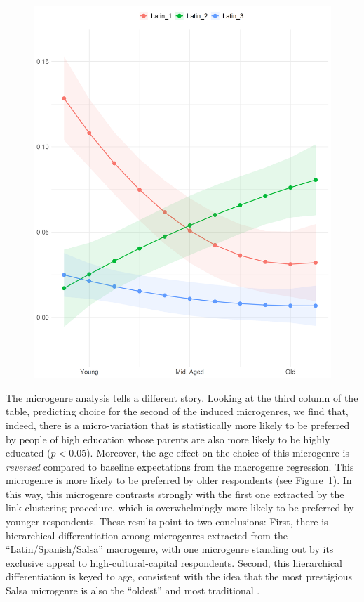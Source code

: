 \documentclass[a4paper,12pt]{extarticle}
\begin{document}
\begin{figure}[ht!]
    \centering    \includegraphics[width=1.0\textwidth]{Plots/Demog/micro-by-age-latin.png}
    \caption{}
    \label{fig:age-salsa}
\end{figure}

The microgenre analysis tells a different story. Looking at the third column of the table, predicting choice for the second of the induced microgenres, we find that, indeed, there is a micro-variation that is statistically more likely to be preferred by people of high education whose parents are also more likely to be highly educated ($p < 0.05$). Moreover, the age effect on the choice of this microgenre is \textit{reversed} compared to baseline expectations from the macrogenre regression. This microgenre is more likely to be preferred by older respondents (see Figure~\ref{fig:age-salsa}). In this way, this microgenre contrasts strongly with the first one extracted by the link clustering procedure, which is overwhelmingly more likely to be preferred by younger respondents. These results point to two conclusions: First, there is hierarchical differentiation among microgenres extracted from the ``Latin/Spanish/Salsa'' macrogenre, with one microgenre standing out by its exclusive appeal to high-cultural-capital respondents. Second, this hierarchical differentiation is keyed to age, consistent with the idea that the most prestigious Salsa microgenre is also the ``oldest'' and most traditional \citep{Bachmayer2014-pk}.
\end{document}

